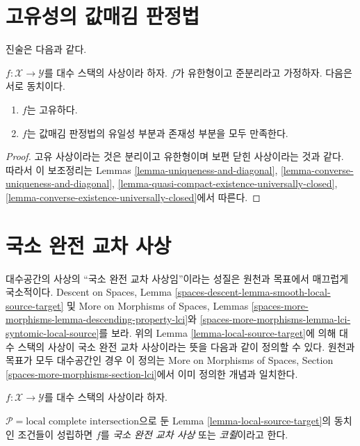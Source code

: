 \section{고유성의 값매김 판정법}
\label{section-valutive-criterion-properness}

\noindent
진술은 다음과 같다.

\begin{lemma}
\label{lemma-criterion-proper}
$f : \mathcal{X} \to \mathcal{Y}$를 대수 스택의 사상이라 하자. $f$가
유한형이고 준분리라고 가정하자. 다음은 서로 동치이다.
\begin{enumerate}
\item $f$는 고유하다.
\item $f$는 값매김 판정법의 유일성 부분과 존재성 부분을 모두 만족한다.
\end{enumerate}
\end{lemma}

\begin{proof}
고유 사상이라는 것은 분리이고 유한형이며 보편 닫힌 사상이라는 것과 같다.
따라서 이 보조정리는 Lemmas
\ref{lemma-uniqueness-and-diagonal},
\ref{lemma-converse-uniqueness-and-diagonal},
\ref{lemma-quasi-compact-existence-universally-closed},
\ref{lemma-converse-existence-universally-closed}에서 따른다.
\end{proof}







\section{국소 완전 교차 사상}
\label{section-lci}

\noindent
대수공간의 사상의 ``국소 완전 교차 사상임''이라는 성질은 원천과 목표에서
매끄럽게 국소적이다. Descent on Spaces, Lemma
\ref{spaces-descent-lemma-smooth-local-source-target} 및 More on Morphisms of
Spaces, Lemmas \ref{spaces-more-morphisms-lemma-descending-property-lci}와
\ref{spaces-more-morphisms-lemma-lci-syntomic-local-source}를 보라. 위의
Lemma \ref{lemma-local-source-target}에 의해 대수 스택의 사상이 국소 완전
교차 사상이라는 뜻을 다음과 같이 정의할 수 있다.
원천과 목표가 모두 대수공간인 경우 이 정의는 More on Morphisms of Spaces,
Section \ref{spaces-more-morphisms-section-lci}에서 이미 정의한 개념과
일치한다.

\begin{definition}
\label{definition-lci}
$f : \mathcal{X} \to \mathcal{Y}$를 대수 스택의 사상이라 하자.\par\noindent
$\mathcal{P} = \text{local complete intersection}$으로 둔 Lemma
\ref{lemma-local-source-target}의 동치인 조건들이 성립하면 $f$를
{\it 국소 완전 교차 사상} 또는 {\it 코쥘}이라고 한다.
\end{definition}

